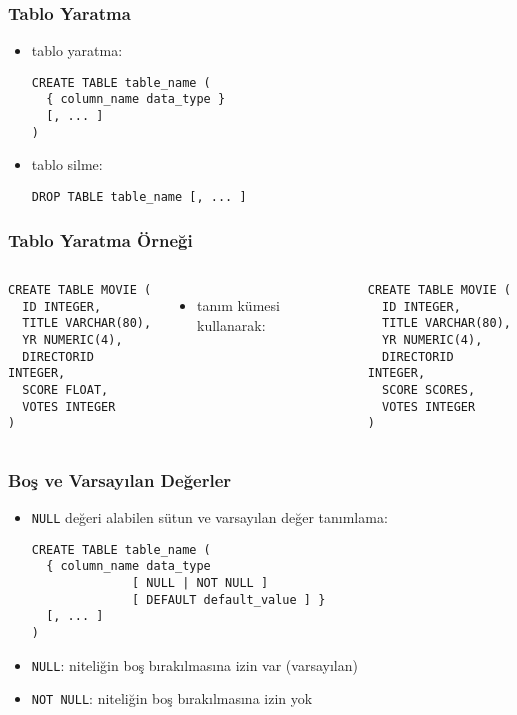 \documentclass[dvipsnames]{beamer}
\theoremstyle{plain}
\begin{document}
\begin{frame}[fragile]
  \frametitle{Tablo Yaratma}
  
  \begin{itemize}
    \item tablo yaratma:
    \begin{lstlisting}
CREATE TABLE table_name (
  { column_name data_type }
  [, ... ]
)
    \end{lstlisting}

    \item tablo silme:
    \begin{lstlisting}
DROP TABLE table_name [, ... ]
    \end{lstlisting}
  \end{itemize}
\end{frame}

\begin{frame}[fragile]
  \frametitle{Tablo Yaratma Örneği}

  \begin{columns}[b]
    \begin{lstlisting}
CREATE TABLE MOVIE (
  ID INTEGER,
  TITLE VARCHAR(80),
  YR NUMERIC(4),
  DIRECTORID INTEGER,
  SCORE FLOAT,
  VOTES INTEGER
)
    \end{lstlisting}

    \pause
    \begin{itemize}
      \item tanım kümesi kullanarak:
    \end{itemize}

    \begin{lstlisting}
CREATE TABLE MOVIE (
  ID INTEGER,
  TITLE VARCHAR(80),
  YR NUMERIC(4),
  DIRECTORID INTEGER,
  SCORE SCORES,
  VOTES INTEGER
)
    \end{lstlisting}
  \end{columns}
\end{frame}

\begin{frame}[fragile]
  \frametitle{Boş ve Varsayılan Değerler}
  
  \begin{itemize}
    \item \texttt{NULL} değeri alabilen sütun ve varsayılan değer tanımlama:
    \begin{lstlisting}
CREATE TABLE table_name (
  { column_name data_type
              [ NULL | NOT NULL ]
              [ DEFAULT default_value ] }
  [, ... ]
)
    \end{lstlisting}

    \item \texttt{NULL}: niteliğin boş bırakılmasına izin var (varsayılan)
    \item \texttt{NOT NULL}: niteliğin boş bırakılmasına izin yok
  \end{itemize}
\end{frame}
\end{document}
